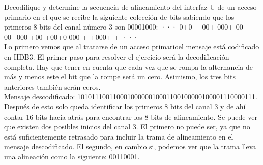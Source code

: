 \begin{exercise}[6]
	Decodifique y determine la secuencia de alineamiento del interfaz U de un acceso primario en el que se recibe la siguiente colección de bits sabiendo que los primeros 8 bits del canal número 3 son 00001000: ···-0+0-+-00+-000+-00-00+000-+00-+00+0-000-+-+000+-+-···\\
	Lo primero vemos que al tratarse de un acceso primarioel mensaje está codificado en HDB3. El primer paso para resolver el ejercicio será la decodificación completa. Hay que tener en cuenta que cada vez que se rompa la alternancia de más y menos este el bit que la rompe será un cero. Asimismo, los tres bits anteriores también serán ceros.\\
	Mensaje descodificado: 10101110011000100000010001100100000100001110000111. Después de esto solo queda identificar los primeros 8 bits del canal 3 y de ahí contar 16 bits hacia atrás para encontrar los 8 bits de alineamiento. Se puede ver que existen dos posibles inicios del canal 3. El primero no puede ser, ya que no está suficientemente retrasado para incluir la trama de alineamiento en el mensaje descodificado. El segundo, en cambio si, podemos ver que la trama lleva una alineación como la siguiente: 00110001.
\end{exercise}
